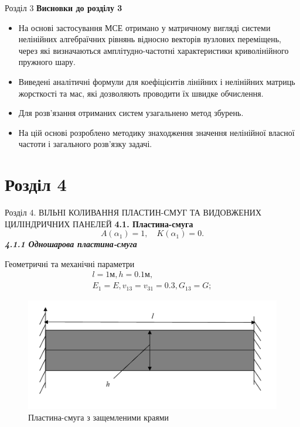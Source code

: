 \documentclass[8pt]{beamer}
\numberwithin{figure}{section}
\numberwithin{equation}{section}
\numberwithin{table}{section}
\begin{document}
\begin{frame}{Розділ 3}
\textbf{Висновки до розділу 3}
\\
\vspace{1em}
\begin{itemize}
\item На основі застосування МСЕ отримано у матричному вигляді системи нелінійних алгебраїчних рівнянь відносно векторів вузлових переміщень, через які визначаються амплітудно-частотні характеристики криволінійного пружного шару.
\item Виведені аналітичні формули для коефіцієнтів лінійних і нелінійних матриць жорсткості та мас, які дозволяють проводити їх швидке обчислення.
\item Для розв'язання отриманих систем узагальнено метод збурень.
\item На цій основі розроблено методику знаходження значення нелінійної власної частоти і загального розв'язку задачі. 
\end{itemize}

\end{frame}

\section{Розділ 4}
\begin{frame}{Розділ 4. ВІЛЬНІ КОЛИВАННЯ ПЛАСТИН-СМУГ ТА ВИДОВЖЕНИХ ЦИЛІНДРИЧНИХ ПАНЕЛЕЙ}
\textbf{4.1. Пластина-смуга}
\begin{equation}
A\left( \alpha_1 \right)=1, \quad K\left( \alpha_1 \right)=0.
\end{equation}
\textbf{\textit{4.1.1 Одношарова пластина-смуга}}
\vspace{1em}

Геометричні та механічні  параметри
\begin{equation}
\begin{gathered}
l=1\text{м}, h=0.1\text{м},\\
E_1=E, v_{13}=v_{31}=0.3, G_{13}=G;
\end{gathered}
\end{equation}
\begin{figure}
	\includegraphics[scale=0.3]{pic/plate.png}
		\caption{Пластина-смуга з защемленими краями}
		\label{fig:plate}
\end{figure}



\end{frame}
\end{document}
